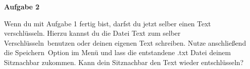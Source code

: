 \documentclass[a4paper,11pt]{scrreprt}
\begin{document}
\vspace{4ex}


\textbf{\Large{Aufgabe 2}}
\vspace{2ex}

Wenn du mit Aufgabe 1 fertig bist, darfst du jetzt selber einen Text verschlüsseln. Hierzu kannst du die Datei \glqq Text zum selber Verschlüsseln\grqq \ benutzen oder deinen eigenen Text schreiben. Nutze anschließend die \glqq Speichern\grqq \ Option im Menü und lass die entstandene .txt Datei deinem Sitznachbar zukommen. Kann dein Sitznachbar den Text wieder entschlüsseln?
\end{document}
